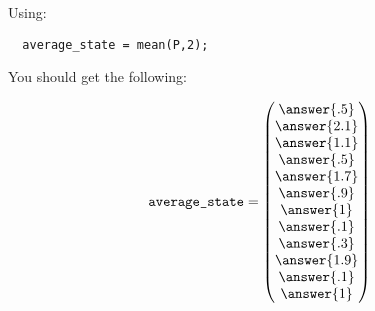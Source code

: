 \documentclass{ximera}
\begin{document}
\begin{exploration}
\begin{example}
\begin{solution}
\begin{enumerate}
Using:

\begin{verbatim}
  average_state = mean(P,2);
\end{verbatim}

You should get the following:

\[
\texttt{average\_state} = \begin{pmatrix}
  \answer{.5}\\
  \answer{2.1}\\
  \answer{1.1}\\
  \answer{.5}\\
  \answer{1.7}\\
  \answer{.9}\\
  \answer{1}\\
  \answer{.1}\\
  \answer{.3}\\
  \answer{1.9}\\
  \answer{.1}\\
  \answer{1}
\end{pmatrix}
\]


  \end{enumerate}
\end{solution}
\end{example}

\end{exploration}
 
\end{document}
